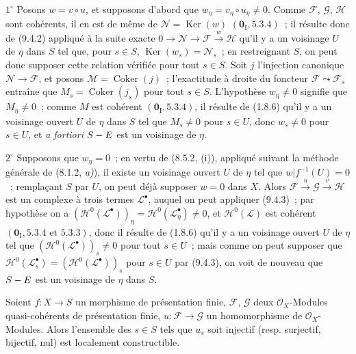 $1^\circ$ Posons $w=v\circ u$, et supposons d'abord que
$w_\eta=v_\eta\circ u_\eta\neq0$. Comme $\mathcal F$, $\mathcal G$,
$\mathcal H$ sont cohérents, il en est de même de
$\mathcal N=\operatorname{Ker}(w)$ $(\mathbf 0_{\mathrm I},5.3.4)$~; il
résulte donc de (9.4.2) appliqué à la suite exacte
$0\to\mathcal N\to\mathcal F\xrightarrow{w}\mathcal H$ qu'il y a un
voisinage $U$ de $\eta$ dans $S$ tel que, pour $s\in S$,
$\operatorname{Ker}(w_s)=\mathcal N_s$~; en restreignant $S$, on peut donc
supposer cette relation vérifiée pour tout $s\in S$. Soit $j$ l'injection
canonique $\mathcal N\to\mathcal F$, et posons
$\mathcal M=\operatorname{Coker}(j)$~; l'exactitude à droite du foncteur
$\mathcal F\leadsto\mathcal F_s$ entraîne que
$M_s=\operatorname{Coker}(j_s)$ pour tout $s\in S$. L'hypothèse
$w_\eta\neq0$ signifie que $M_\eta\neq0$~; comme $M$ est
cohérent $(\mathbf 0_{\mathrm I},5.3.4)$, il résulte de (1.8.6) qu'il y a un
voisinage ouvert $U$ de $\eta$ dans $S$ tel que $M_s\neq0$ pour
$s\in U$, donc $w_s\neq0$ pour $s\in U$, et \emph{a fortiori} $S- E$ est un
voisinage de $\eta$.

$2^\circ$ Supposons que $w_\eta=0$~; en vertu de (8.5.2, (i)), appliqué
suivant la méthode générale de (8.1.2, \emph{a)}), il existe un voisinage
ouvert $U$ de $\eta$ tel que $w|f^{-1}(U)=0$~; remplaçant $S$ par $U$, on peut
déjà supposer $w=0$ dans $X$. Alors
$\mathcal F\xrightarrow{u}\mathcal G\xrightarrow{v}\mathcal H$ est un
complexe à trois termes $\mathcal L^\bullet$, auquel on peut appliquer
(9.4.3)~; par hypothèse on a
$(\mathcal H^0(\mathcal L^\bullet))_\eta=
\mathcal H^0(\mathcal L^\bullet_\eta)\neq0$, et
$\mathcal H^0(\mathcal L)$ est cohérent
$(\mathbf 0_{\mathrm I},5.3.4\text{ et }5.3.3)$, donc il résulte de (1.8.6)
qu'il y a un voisinage ouvert $U$ de $\eta$ tel que
$(\mathcal H^0(\mathcal L^\bullet))_s\neq0$ pour tout $s\in U$~; mais comme
on peut supposer que
$\mathcal H^0(\mathcal L_s^\bullet)=(\mathcal H^0(\mathcal L^\bullet))_s$
pour $s\in U$ par (9.4.3), on voit de nouveau que $S- E$ est un voisinage de
$\eta$ dans $S$.


\begin{corollary}[9.4.5]
\label{IV.9.4.5-fr}
Soient $f:X\to S$ un morphisme de présentation finie, $\mathcal F$,
$\mathcal G$ deux $\mathcal O_X$-Modules quasi-cohérents de présentation finie,
$u:\mathcal F\to\mathcal G$ un homomorphisme de $\mathcal O_X$-Modules.
Alors l'ensemble des $s\in S$ tels que $u_s$ soit injectif
\textnormal{(resp.} surjectif, bijectif, nul\textnormal{)} est localement
constructible.
\end{corollary}

